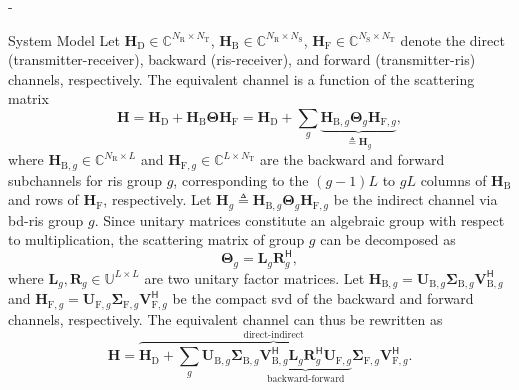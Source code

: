 \begin{section}{-}
\begin{subsection}{System Model}
		Let $\mathbf{H}_\mathrm{D} \in \mathbb{C}^{N_\mathrm{R} \times N_\mathrm{T}}$, $\mathbf{H}_\mathrm{B} \in \mathbb{C}^{N_\mathrm{R} \times N_\mathrm{S}}$, $\mathbf{H}_\mathrm{F} \in \mathbb{C}^{N_\mathrm{S} \times N_\mathrm{T}}$ denote the direct (transmitter-receiver), backward (\gls{ris}-receiver), and forward (transmitter-\gls{ris}) channels, respectively.
		The equivalent channel is a function of the scattering matrix
		\begin{equation}
			\mathbf{H} = \mathbf{H}_\mathrm{D} + \mathbf{H}_\mathrm{B} \mathbf{\Theta} \mathbf{H}_\mathrm{F} = \mathbf{H}_\mathrm{D} + \sum_g \underbrace{\mathbf{H}_{\mathrm{B},g} \mathbf{\Theta}_g \mathbf{H}_{\mathrm{F},g}}_{\triangleq \mathbf{H}_g},
			\label{eq:channel_equivalent}
		\end{equation}
		where $\mathbf{H}_{\mathrm{B},g} \in \mathbb{C}^{N_\mathrm{R} \times L}$ and $\mathbf{H}_{\mathrm{F},g} \in \mathbb{C}^{L \times N_\mathrm{T}}$ are the backward and forward subchannels for \gls{ris} group $g$, corresponding to the $(g{-}1)L$ to $gL$ columns of $\mathbf{H}_\mathrm{B}$ and rows of $\mathbf{H}_\mathrm{F}$, respectively.
		Let $\mathbf{H}_g \triangleq \mathbf{H}_{\mathrm{B},g} \mathbf{\Theta}_g \mathbf{H}_{\mathrm{F},g}$ be the indirect channel via \gls{bd}-\gls{ris} group $g$.
		Since unitary matrices constitute an algebraic group with respect to multiplication, the scattering matrix of group $g$ can be decomposed as
		\begin{equation}
			\mathbf{\Theta}_g = \mathbf{L}_g \mathbf{R}_g^\mathsf{H},
		\end{equation}
		where $\mathbf{L}_g, \mathbf{R}_g \in \mathbb{U}^{L \times L}$ are two unitary factor matrices.
		Let $\mathbf{H}_{\mathrm{B},g} = \mathbf{U}_{\mathrm{B},g} \mathbf{\Sigma}_{\mathrm{B},g} \mathbf{V}_{\mathrm{B},g}^\mathsf{H}$ and $\mathbf{H}_{\mathrm{F},g} = \mathbf{U}_{\mathrm{F},g} \mathbf{\Sigma}_{\mathrm{F},g} \mathbf{V}_{\mathrm{F},g}^\mathsf{H}$ be the compact \gls{svd} of the backward and forward channels, respectively.
		The equivalent channel can thus be rewritten as
		\begin{equation}
			\mathbf{H} = \overbrace{\mathbf{H}_\mathrm{D} + \sum_g \mathbf{U}_{\mathrm{B},g} \mathbf{\Sigma}_{\mathrm{B},g} \underbrace{\mathbf{V}_{\mathrm{B},g}^\mathsf{H} \mathbf{L}_g \mathbf{R}_g^\mathsf{H} \mathbf{U}_{\mathrm{F},g}}_\text{backward-forward} \mathbf{\Sigma}_{\mathrm{F},g} \mathbf{V}_{\mathrm{F},g}^\mathsf{H}}^\text{direct-indirect}.
			\label{eq:channel_equivalent_svd}
		\end{equation}


\end{subsection}
\end{section}
